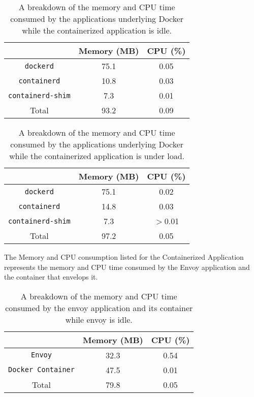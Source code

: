 \documentclass{article}
\begin{document}
\begin{table}[H]
\begin{tabular}{ |c|c|c| }
 \hline
   & Memory (MB) & CPU (\%) \\ 
 \hline
 \texttt{dockerd} & 75.1 & 0.05 \\
 \hline
 \texttt{containerd} & 10.8 & 0.03 \\
 \hline
 \texttt{containerd-shim} & 7.3 & 0.01 \\
 \hline\hline
 Total & 93.2 & 0.09 \\
 \hline
\end{tabular}
\caption{A breakdown of the memory and CPU time consumed by the applications underlying Docker while the containerized application is idle.}
\label{idle-consumption-breakdown}
\end{table}

\begin{table}[H]
\begin{tabular}{ |c|c|c| }
 \hline
   & Memory (MB) & CPU (\%) \\ 
 \hline
 \texttt{dockerd} & 75.1 & 0.02 \\
 \hline
 \texttt{containerd} & 14.8 & 0.03 \\
 \hline
 \texttt{containerd-shim} & 7.3 & $>$0.01 \\
 \hline\hline
 Total & 97.2 & 0.05 \\
 \hline
\end{tabular}
\caption{A breakdown of the memory and CPU time consumed by the applications underlying Docker while the containerized application is under load.}
\label{consumption-under-load-breakdown}
\end{table}

The Memory and CPU consumption listed for the Containerized Application represents the memory and CPU time consumed by the Envoy application and the container that envelops it.

\begin{table}[H]
\begin{tabular}{ |c|c|c| }
 \hline
   & Memory (MB) & CPU (\%) \\ 
 \hline
 \texttt{Envoy} & 32.3 & 0.54 \\
 \hline
 \texttt{Docker Container} & 47.5 & 0.01 \\
 \hline\hline
 Total & 79.8 & 0.05 \\
 \hline
\end{tabular}
\caption{A breakdown of the memory and CPU time consumed by the envoy application and its container while envoy is idle.}
\label{idle-app-consumption-breakdown}
\end{table}
\end{document}
